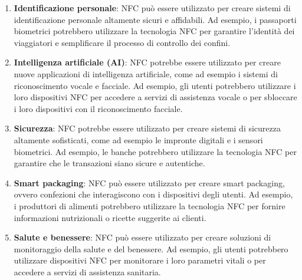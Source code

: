 \documentclass[a4paper,11pt]{report}
\begin{document}
\begin{enumerate}
    \item \textbf{Identificazione personale}: NFC può essere utilizzato per creare sistemi di identificazione personale altamente sicuri e affidabili. Ad esempio, i passaporti biometrici potrebbero utilizzare la tecnologia NFC per garantire l'identità dei viaggiatori e semplificare il processo di controllo dei confini.
    \item \textbf{Intelligenza artificiale (AI)}: NFC potrebbe essere utilizzato per creare nuove applicazioni di intelligenza artificiale, come ad esempio i sistemi di riconoscimento vocale e facciale. Ad esempio, gli utenti potrebbero utilizzare i loro dispositivi NFC per accedere a servizi di assistenza vocale o per sbloccare i loro dispositivi con il riconoscimento facciale.
    \item \textbf{Sicurezza}: NFC potrebbe essere utilizzato per creare sistemi di sicurezza altamente sofisticati, come ad esempio le impronte digitali e i sensori biometrici. Ad esempio, le banche potrebbero utilizzare la tecnologia NFC per garantire che le transazioni siano sicure e autentiche.
    \item \textbf{Smart packaging}: NFC può essere utilizzato per creare smart packaging, ovvero confezioni che interagiscono con i dispositivi degli utenti. Ad esempio, i produttori di alimenti potrebbero utilizzare la tecnologia NFC per fornire informazioni nutrizionali o ricette suggerite ai clienti.
    \item \textbf{Salute e benessere}: NFC può essere utilizzato per creare soluzioni di monitoraggio della salute e del benessere. Ad esempio, gli utenti potrebbero utilizzare dispositivi NFC per monitorare i loro parametri vitali o per accedere a servizi di assistenza sanitaria.
\end{enumerate}
\end{document}
